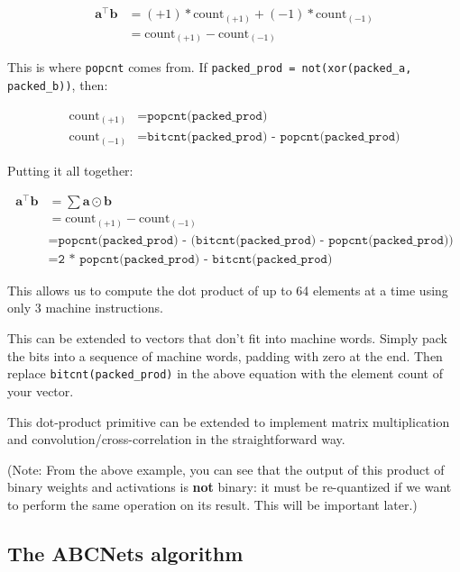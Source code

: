 \documentclass[12pt]{article}
\newcommand{\av}[0]{\mathbf{a}}
\newcommand{\bv}[0]{\mathbf{b}}
\newcommand{\transpose}[1]{#1 ^\top}
\newcommand{\dotp}[2]{\transpose{#1} #2}
\newcommand{\hadamard}[0]{\odot}
\begin{document}
\begin{align*}
\dotp{\av}{\bv} &= (+1) * \mathrm{count}_{(+1)} + (-1) *
   \mathrm{count}_{(-1)} \\
&= \mathrm{count}_{(+1)} -
   \mathrm{count}_{(-1)}
\end{align*}

This is where \texttt{popcnt} comes from. If
\texttt{packed\_prod = not(xor(packed\_a, packed\_b))}, then:

\begin{align*}
\mathrm{count}_{(+1)} &= \texttt{popcnt(packed\_prod)} \\
\mathrm{count}_{(-1)} &= \texttt{bitcnt(packed\_prod) - popcnt(packed\_prod)}
\end{align*}

Putting it all together:

\begin{align*}
\dotp{\av}{\bv} &= \sum \av \hadamard \bv \\
                &= \mathrm{count}_{(+1)} - \mathrm{count}_{(-1)} \\
                &= \texttt{popcnt(packed\_prod) -
                   (bitcnt(packed\_prod) - popcnt(packed\_prod))} \\
                &= \texttt{2 * popcnt(packed\_prod) - bitcnt(packed\_prod)}
\end{align*}

This allows us to compute the dot product of up to 64 elements at a time using only 3 machine instructions.

This can be extended to vectors that don't fit into machine words. Simply pack the bits into a sequence of machine words, padding with zero at the end. Then replace \texttt{bitcnt(packed\_prod)} in the above equation with the element count of your vector.

This dot-product primitive can be extended to implement matrix multiplication and convolution/cross-correlation in the straightforward way.

(Note: From the above example, you can see that the output of this product of binary weights and activations is \textbf{not} binary: it must be re-quantized if we want to perform the same operation on its result. This will be important later.)

\subsection{The ABCNets algorithm}
\label{sec:orga5f3235}
\end{document}
